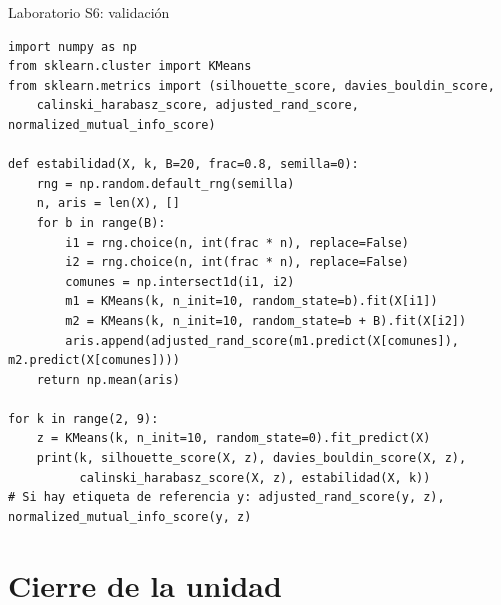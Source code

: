 \documentclass[aspectratio=169,11pt]{beamer}
\begin{document}
\begin{frame}[fragile]{Laboratorio S6: validación}
\begin{lstlisting}[basicstyle=\ttfamily\fontsize{6.5}{7.5}\selectfont]
import numpy as np
from sklearn.cluster import KMeans
from sklearn.metrics import (silhouette_score, davies_bouldin_score,
    calinski_harabasz_score, adjusted_rand_score, normalized_mutual_info_score)

def estabilidad(X, k, B=20, frac=0.8, semilla=0):
    rng = np.random.default_rng(semilla)
    n, aris = len(X), []
    for b in range(B):
        i1 = rng.choice(n, int(frac * n), replace=False)
        i2 = rng.choice(n, int(frac * n), replace=False)
        comunes = np.intersect1d(i1, i2)
        m1 = KMeans(k, n_init=10, random_state=b).fit(X[i1])
        m2 = KMeans(k, n_init=10, random_state=b + B).fit(X[i2])
        aris.append(adjusted_rand_score(m1.predict(X[comunes]), m2.predict(X[comunes])))
    return np.mean(aris)

for k in range(2, 9):
    z = KMeans(k, n_init=10, random_state=0).fit_predict(X)
    print(k, silhouette_score(X, z), davies_bouldin_score(X, z),
          calinski_harabasz_score(X, z), estabilidad(X, k))
# Si hay etiqueta de referencia y: adjusted_rand_score(y, z), normalized_mutual_info_score(y, z)
\end{lstlisting}
\end{frame}

\section{Cierre de la unidad}
\end{document}
